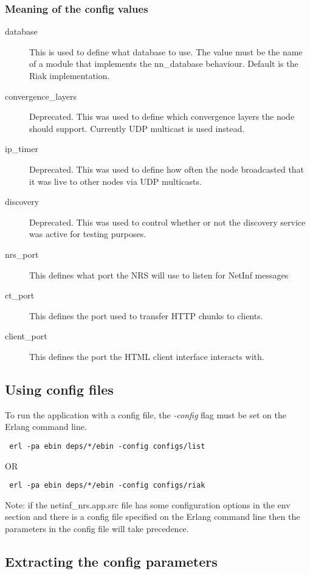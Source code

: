 \subsubsection {Meaning of the config values}
\begin{description}
\item[database]
This is used to define what database to use. The value must be the name of a module that implements the nn\_database behaviour. Default is the Riak implementation.
\item[convergence\_layers]
Deprecated. This was used to define which convergence layers the node should support. Currently UDP multicast is used instead.
\item[ip\_timer]
Deprecated. This was used to define how often the node broadcasted that it was live to other nodes via UDP multicasts.
\item[discovery]
Deprecated. This was used to control whether or not the discovery service was active for testing purposes.
\item[nrs\_port]
This defines what port the NRS will use to listen for NetInf messages
\item[ct\_port]
This defines the port used to transfer HTTP chunks to clients.
\item[client\_port]
This defines the port the HTML client interface interacts with.
\end{description}

\subsection {Using config files}

To run the application with a config file, the \emph{-config} flag must be set on the Erlang command line.

\begin {verbatim}
 erl -pa ebin deps/*/ebin -config configs/list
\end{verbatim}

OR

\begin {verbatim}
 erl -pa ebin deps/*/ebin -config configs/riak
\end{verbatim}

Note: if the netinf\_nrs.app.src file has some configuration options in the env section and there is a config file specified on the Erlang command line then the parameters in the config file  will take precedence.

\subsection {Extracting the config parameters}

